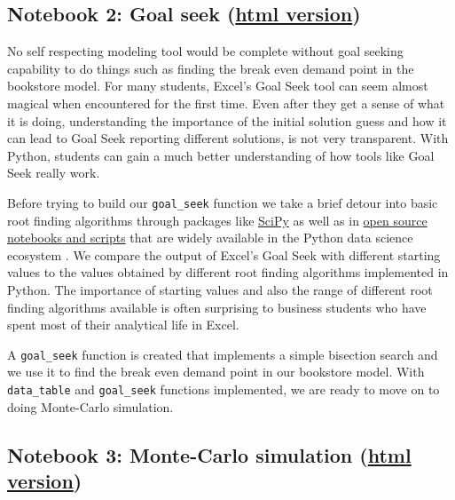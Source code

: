 \documentclass[ited,blindrev]{informs3}              %
\newcommand{\code}[1]{\texttt{#1}}
\begin{document}
\subsection{Notebook 2: Goal seek (\href{http://www.sba.oakland.edu/faculty/isken/excel_with_python/what_if_2_goalseek.html}{html version})}

No self respecting modeling tool would be complete without goal seeking capability to do things such as finding the break even demand point in the bookstore model. For many students, Excel's Goal Seek tool can seem almost magical when encountered for the first time. Even after they get a sense of what it is doing, understanding the importance of the initial solution guess and how it can lead to Goal Seek reporting different solutions, is not very transparent. With Python, students can gain a much better understanding of how tools like Goal Seek really work. 

Before trying to build our \code{goal\_seek} function we take a brief detour into basic root finding algorithms through packages like \href{https://docs.scipy.org/doc/scipy/tutorial/optimize.html#root-finding}{SciPy} \cite{2020SciPy-NMeth} as well as in \href{https://github.com/patrickwalls/mathematical-python/}{open source notebooks and scripts} that are widely available in the Python data science ecosystem \cite{wallsMathematicalPython2023}. We compare the output of Excel's Goal Seek with different starting values to the values obtained by different root finding algorithms implemented in Python. The importance of starting values and also the range of different root finding algorithms available is often surprising to business students who have spent most of their analytical life in Excel.

A \code{goal\_seek} function is created that implements a simple bisection search and we use it to find the break even demand point in our bookstore model. With \code{data\_table} and \code{goal\_seek} functions implemented, we are ready to move on to doing Monte-Carlo simulation.

\subsection{Notebook 3: Monte-Carlo simulation (\href{http://www.sba.oakland.edu/faculty/isken/excel_with_python/what_if_3_simulation.html}{html version})}
\end{document}
